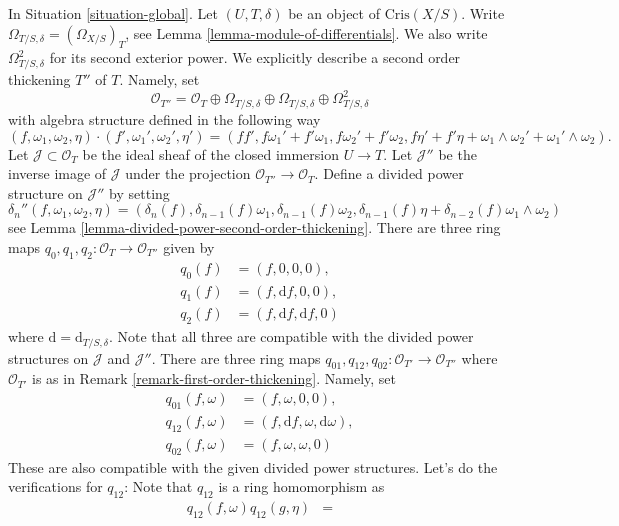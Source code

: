 \begin{remark}
\label{remark-second-order-thickening}
In Situation \ref{situation-global}.
Let $(U, T, \delta)$ be an object of $\text{Cris}(X/S)$.
Write $\Omega_{T/S, \delta} = (\Omega_{X/S})_T$, see
Lemma \ref{lemma-module-of-differentials}.
We also write $\Omega^2_{T/S, \delta}$ for its second exterior
power. We explicitly describe a second order thickening $T''$ of $T$.
Namely, set
$$
\mathcal{O}_{T''} =
\mathcal{O}_T \oplus \Omega_{T/S, \delta} \oplus \Omega_{T/S, \delta}
\oplus \Omega^2_{T/S, \delta}
$$
with algebra structure defined in the following way
$$
(f, \omega_1, \omega_2, \eta) \cdot
(f', \omega_1', \omega_2', \eta') =
(ff', f\omega_1' + f'\omega_1, f\omega_2' + f'\omega_2,
f\eta' + f'\eta + \omega_1 \wedge \omega_2' + \omega_1' \wedge \omega_2).
$$
Let $\mathcal{J} \subset \mathcal{O}_T$
be the ideal sheaf of the closed immersion $U \to T$. Let
$\mathcal{J}''$ be the inverse image of $\mathcal{J}$ under the
projection $\mathcal{O}_{T''} \to \mathcal{O}_T$.
Define a divided power structure on $\mathcal{J}''$ by setting
$$
\delta_n''(f, \omega_1, \omega_2, \eta) =
(\delta_n(f), \delta_{n - 1}(f)\omega_1, \delta_{n - 1}(f)\omega_2,
\delta_{n - 1}(f)\eta + \delta_{n - 2}(f)\omega_1 \wedge \omega_2)
$$
see Lemma \ref{lemma-divided-power-second-order-thickening}.
There are three ring maps
$q_0, q_1, q_2 : \mathcal{O}_T \to \mathcal{O}_{T''}$
given by
\begin{align*}
q_0(f) & = (f, 0, 0, 0), \\
q_1(f) & = (f, \text{d}f, 0, 0), \\
q_2(f) & = (f, \text{d}f, \text{d}f, 0)
\end{align*}
where $\text{d} = \text{d}_{T/S, \delta}$.
Note that all three are compatible with the divided power structures
on $\mathcal{J}$ and $\mathcal{J}''$. There are three ring maps
$q_{01}, q_{12}, q_{02} : \mathcal{O}_{T'} \to \mathcal{O}_{T''}$
where $\mathcal{O}_{T'}$ is as in Remark \ref{remark-first-order-thickening}.
Namely, set
\begin{align*}
q_{01}(f, \omega) & = (f, \omega, 0, 0), \\
q_{12}(f, \omega) & =
(f, \text{d}f, \omega, \text{d}\omega), \\
q_{02}(f, \omega) & = (f, \omega, \omega, 0)
\end{align*}
These are also compatible with the given divided power
structures. Let's do the verifications for $q_{12}$: Note
that $q_{12}$ is a ring homomorphism as
\begin{align*}
q_{12}(f, \omega)q_{12}(g, \eta) & =

\end{align*}
\end{remark}
